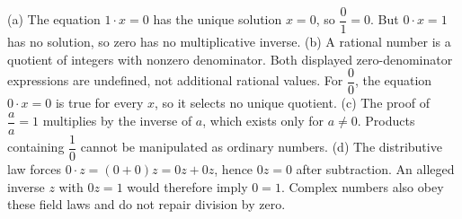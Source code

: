(a) The equation $1\cdot x=0$ has the unique solution $x=0$, so $\dfrac{0}{1}=0$. But $0\cdot x=1$ has no solution, so zero has no multiplicative inverse. (b) A rational number is a quotient of integers with nonzero denominator. Both displayed zero-denominator expressions are undefined, not additional rational values. For $\dfrac{0}{0}$, the equation $0\cdot x=0$ is true for every $x$, so it selects no unique quotient. (c) The proof of $\dfrac{a}{a}=1$ multiplies by the inverse of $a$, which exists only for $a\ne0$. Products containing $\dfrac{1}{0}$ cannot be manipulated as ordinary numbers. (d) The distributive law forces $0\cdot z=(0+0)z=0z+0z$, hence $0z=0$ after subtraction. An alleged inverse $z$ with $0z=1$ would therefore imply $0=1$. Complex numbers also obey these field laws and do not repair division by zero.
